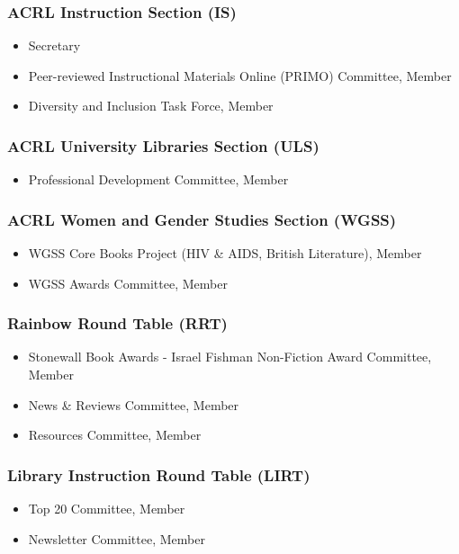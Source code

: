 \documentclass[
  letterpaper,
  DIV=11,
  numbers=noendperiod]{scrartcl}
\providecommand{\tightlist}{%
  \setlength{\itemsep}{0pt}\setlength{\parskip}{0pt}}\usepackage{longtable,booktabs,array}
\begin{document}
\subsubsection{ACRL Instruction Section
(IS)}\label{acrl-instruction-section-is}

\begin{itemize}
\tightlist
\item
  Secretary
\item
  Peer-reviewed Instructional Materials Online (PRIMO) Committee, Member
\item
  Diversity and Inclusion Task Force, Member
\end{itemize}

\subsubsection{ACRL University Libraries Section
(ULS)}\label{acrl-university-libraries-section-uls}

\begin{itemize}
\tightlist
\item
  Professional Development Committee, Member
\end{itemize}

\subsubsection{ACRL Women and Gender Studies Section
(WGSS)}\label{acrl-women-and-gender-studies-section-wgss}

\begin{itemize}
\tightlist
\item
  WGSS Core Books Project (HIV \& AIDS, British Literature), Member
\item
  WGSS Awards Committee, Member
\end{itemize}

\subsubsection{Rainbow Round Table (RRT)}\label{rainbow-round-table-rrt}

\begin{itemize}
\tightlist
\item
  Stonewall Book Awards - Israel Fishman Non-Fiction Award Committee,
  Member
\item
  News \& Reviews Committee, Member
\item
  Resources Committee, Member
\end{itemize}

\subsubsection{Library Instruction Round Table
(LIRT)}\label{library-instruction-round-table-lirt}

\begin{itemize}
\tightlist
\item
  Top 20 Committee, Member
\item
  Newsletter Committee, Member
\end{itemize}
\end{document}
